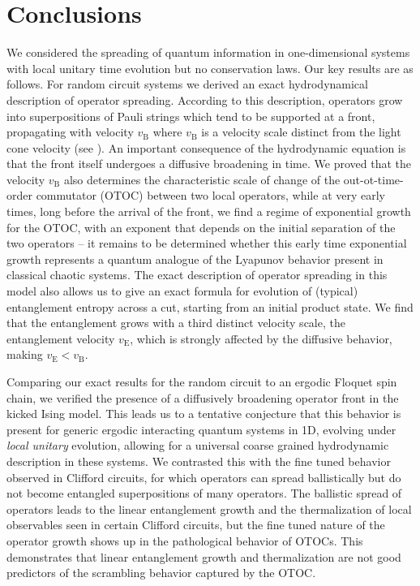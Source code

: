 \documentclass[aps,prb,twocolumn,superscriptaddress]{revtex4-1}
\begin{document}
\section{Conclusions}\label{s:conclusion}
We considered the spreading of quantum information in one-dimensional systems with local unitary time evolution but no conservation laws. Our key results are as follows. For random circuit systems we derived an exact hydrodynamical description of operator spreading. According to this description, operators grow into superpositions of Pauli strings which tend to be supported at a front, propagating with velocity $v_{\text{B}}$ where $v_{\text{B}}$ is a velocity scale distinct from the light cone velocity (see ). An important consequence of the hydrodynamic equation is that the front itself undergoes a diffusive broadening in time. We proved that the velocity $v_{\text{B}}$ also determines the characteristic scale of change of the out-ot-time-order commutator (OTOC) between two local operators, while at very early times, long before the arrival of the front, we find a regime of exponential growth for the OTOC, with an exponent that depends on the initial separation of the two operators -- it remains to be determined whether this  early time exponential growth represents a quantum analogue of the Lyapunov behavior present in classical chaotic systems. The exact description of operator spreading in this model also allows us to give an exact formula for evolution of (typical) entanglement entropy across a cut, starting from an initial product state. We find that the entanglement grows with a third distinct velocity scale, the entanglement velocity $v_\text{E}$, which is strongly affected by the diffusive behavior, making $v_\text{E} < v_{\text{B}}$.

Comparing our exact results for the random circuit to an ergodic Floquet spin chain, we verified the presence of a diffusively broadening operator front in the kicked Ising model. This leads us to a tentative conjecture that this behavior is present for generic ergodic interacting quantum systems in 1D, evolving under \textit{local unitary} evolution, allowing for a universal coarse grained hydrodynamic description in these systems. We contrasted this with the fine tuned behavior observed in Clifford circuits, for which operators can spread ballistically but do not  become entangled superpositions of many operators. The ballistic spread of operators leads to the linear entanglement growth and the thermalization of local observables seen in certain Clifford circuits, but the fine tuned nature of the operator growth shows up in the pathological behavior of OTOCs. This demonstrates that linear entanglement growth and thermalization are not good predictors of the scrambling behavior captured by the OTOC. 
\end{document}
